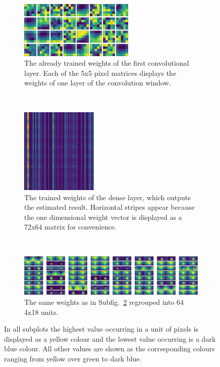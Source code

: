 \begin{figure}[h!]
	\centering
	\begin{subfigure}[t]{\textwidth}
		\centering
		\includegraphics[width=0.6\textwidth]{img/implementation_neuralNetwork_structureOfOurNeuralNetwork_conv2D_1.png}
		\caption{The already trained weights of the first convolutional layer. Each of the 5x5 pixel matrices displays the weights of one layer of the convolution window.}
		\label{pic:implementation_neuralNetwork_structureOfOurNeuralNetwork_weights_a}
	\end{subfigure}
	~
	\begin{subfigure}[t]{\textwidth}
		\centering
		\includegraphics[width=0.4\textwidth]{img/implementation_neuralNetwork_structureOfOurNeuralNetwork_dense_1.png}
		\caption{The trained weights of the dense layer, which outputs the estimated result. Horizontal stripes appear because the one dimensional weight vector is displayed as a 72x64 matrix for convenience.}
		\label{pic:implementation_neuralNetwork_structureOfOurNeuralNetwork_weights_c}
	\end{subfigure}
	~
	\begin{subfigure}[t]{\textwidth}
		\centering
		\includegraphics[width=\textwidth]{img/implementation_neuralNetwork_structureOfOurNeuralNetwork_dense_1b.png}
		\caption{The same weights as in Subfig.~\ref{pic:implementation_neuralNetwork_structureOfOurNeuralNetwork_weights_c} regrouped into 64 4x18 units.}
		\label{pic:implementation_neuralNetwork_structureOfOurNeuralNetwork_weights_d}
	\end{subfigure}
	\caption{In all subplots the highest value occurring in a unit of pixels is displayed as a yellow colour and the lowest value occurring is a dark blue colour. All other values are shown as the corresponding colours ranging from yellow over green to dark blue.}
	\label{pic:implementation_neuralNetwork_structureOfOurNeuralNetwork_weights1}
\end{figure}

